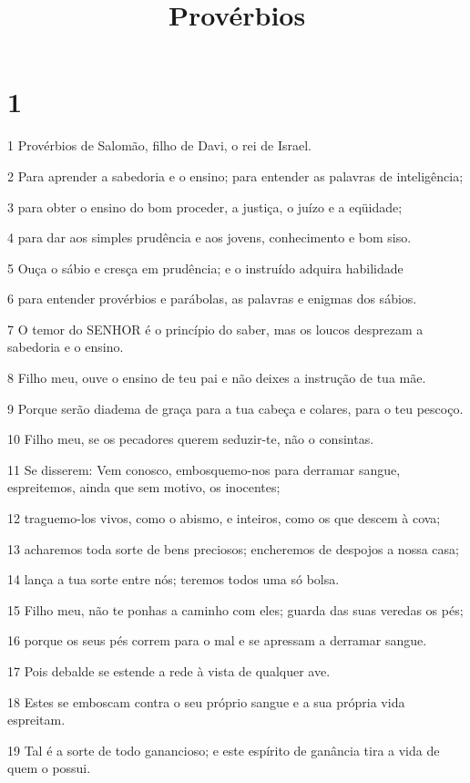 

\title{Provérbios}


\chapter{1}

\par 1 Provérbios de Salomão, filho de Davi, o rei de Israel.
\par 2 Para aprender a sabedoria e o ensino; para entender as palavras de inteligência;
\par 3 para obter o ensino do bom proceder, a justiça, o juízo e a eqüidade;
\par 4 para dar aos simples prudência e aos jovens, conhecimento e bom siso.
\par 5 Ouça o sábio e cresça em prudência; e o instruído adquira habilidade
\par 6 para entender provérbios e parábolas, as palavras e enigmas dos sábios.
\par 7 O temor do SENHOR é o princípio do saber, mas os loucos desprezam a sabedoria e o ensino.
\par 8 Filho meu, ouve o ensino de teu pai e não deixes a instrução de tua mãe.
\par 9 Porque serão diadema de graça para a tua cabeça e colares, para o teu pescoço.
\par 10 Filho meu, se os pecadores querem seduzir-te, não o consintas.
\par 11 Se disserem: Vem conosco, embosquemo-nos para derramar sangue, espreitemos, ainda que sem motivo, os inocentes;
\par 12 traguemo-los vivos, como o abismo, e inteiros, como os que descem à cova;
\par 13 acharemos toda sorte de bens preciosos; encheremos de despojos a nossa casa;
\par 14 lança a tua sorte entre nós; teremos todos uma só bolsa.
\par 15 Filho meu, não te ponhas a caminho com eles; guarda das suas veredas os pés;
\par 16 porque os seus pés correm para o mal e se apressam a derramar sangue.
\par 17 Pois debalde se estende a rede à vista de qualquer ave.
\par 18 Estes se emboscam contra o seu próprio sangue e a sua própria vida espreitam.
\par 19 Tal é a sorte de todo ganancioso; e este espírito de ganância tira a vida de quem o possui.
